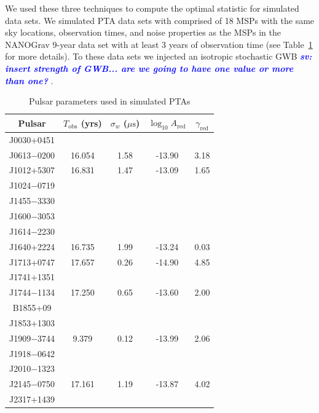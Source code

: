 \documentclass[twocolumn,aps,prd,superscriptaddress]{revtex4-1}
\newcommand{\sv}[1]{\textcolor{blue}{\it{\textbf{sv: #1}}} }
\begin{document}
We used these three techniques to compute the optimal statistic for simulated data sets. 
We simulated PTA data sets with comprised of 18 MSPs 
with the same sky locations, observation times, and noise properties 
as the MSPs in the NANOGrav 9-year data set 
with at least 3 years of observation time \citep{abb+15} 
(see Table~\ref{tab:sim} for more details). 
To these data sets we injected an isotropic stochastic GWB 
\sv{insert strength of GWB... are we going to have one value or more than one?}.
\begin{table}[htb]
	\setlength{\tabcolsep}{5pt}
	\caption{Pulsar parameters used in simulated PTAs}
	\begin{center}
	\begin{tabular}{ccccc}
		\hline\hline
    		Pulsar	& $T_\mathrm{obs}$ (yrs) & $\sigma_w$ ($\mu\mathrm{s}$) & $\log_{10}A_\mathrm{red}$ & $\gamma_\mathrm{red}$ \\
		\hline
		J0030+0451 & & & \\
		J0613$-$0200 & 16.054 & 1.58 & -13.90 & 3.18 \\
		J1012+5307 & 16.831 & 1.47 & -13.09 & 1.65 \\
		J1024$-$0719 & & & \\
		J1455$-$3330 & & & \\
		J1600$-$3053 & & & \\
		J1614$-$2230 & & & \\
		J1640+2224 & 16.735 & 1.99 & -13.24 & 0.03 \\
		J1713+0747 & 17.657 & 0.26 & -14.90 & 4.85 \\
		J1741+1351 & & & \\
		J1744$-$1134 & 17.250 & 0.65 & -13.60 & 2.00 \\
		B1855+09 & & & \\
		J1853+1303 & & & \\
		J1909$-$3744 & 9.379 & 0.12 & -13.99 & 2.06 \\
		J1918$-$0642 & & & \\
		J2010$-$1323 & & & \\
		J2145$-$0750 & 17.161 & 1.19 & -13.87 & 4.02 \\
		J2317+1439 & & & \\
    		\hline\hline
	\end{tabular}
	\end{center}
	\label{tab:sim}
\end{table}
\end{document}
